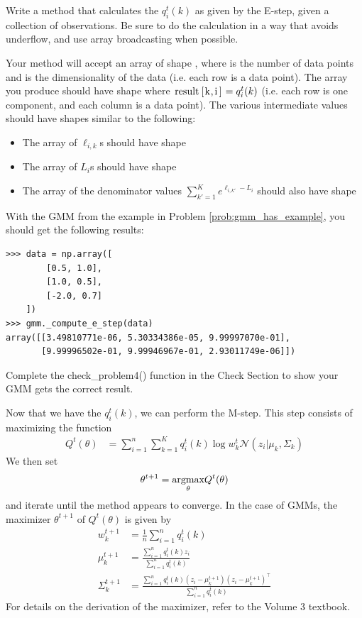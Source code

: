 \begin{problem}
\label{gmm:prob:estep}
Write a method  that calculates the \(q_i^t(k)\) as given by the E-step, given a collection of observations.
Be sure to do the calculation in a way that avoids underflow, and use array broadcasting when possible.

Your method will accept an array of shape , where  is the number of data points and  is the dimensionality of the data (i.e. each row is a data point).
The array you produce should have shape  where \(\text{\li{result[k,i]}} = q_i^t(k)\) (i.e. each row is one component, and each column is a data point).
The various intermediate values should have shapes similar to the following:
\begin{itemize}
\item The array of \(\ell_{i,k}\)s should have shape 
\item The array of \(L_i\)s should have shape 
\item The array of the denominator values \(\sum_{k'=1}^K
e^{\ell_{i,k'}-L_i}\) should also have shape 
\end{itemize}

\noindent
With the GMM from the example in Problem \ref{prob:gmm_has_example}, you should get the following results:
\begin{lstlisting}
>>> data = np.array([
        [0.5, 1.0],
        [1.0, 0.5],
        [-2.0, 0.7]
    ])
>>> gmm._compute_e_step(data)
array([[3.49810771e-06, 5.30334386e-05, 9.99997070e-01],
       [9.99996502e-01, 9.99946967e-01, 2.93011749e-06]])
\end{lstlisting}

Complete the check\_problem4() function in the Check Section to show your GMM gets the correct result.
\end{problem}

Now that we have the \(q_i^t(k)\), we can perform the M-step.
This step consists of maximizing the function
\begin{align*}
Q^t(\theta)
&=\sum_{i=1}^n
\sum_{k=1}^K
q_i^t(k)\log w_k^t\mathcal{N}(z_i| \mu_k,\Sigma_k)
\end{align*}
We then set
\[
\theta^{t+1}=\underset{\theta}{\mbox{argmax}} Q^t(\theta)
\]
and iterate until the method appears to converge.
In the case of GMMs, the maximizer \(\theta^{t+1}\) of \(Q^t(\theta)\) is given by
\begin{align*}
w_k^{t+1}&=\frac{1}{n}\sum_{i=1}^n q_i^t(k) \\
\mu_k^{t+1}
&=
\frac{\sum_{i=1}^n q_i^t(k) z_i}{\sum_{i=1}^n q_i^t(k)}
\\
\Sigma_k^{t+1}
&=
\frac{\sum_{i=1}^n q_i^t(k) (z_i-\mu_k^{t+1})(z_i-\mu_k^{t+1})^\top}{\sum_{i=1}^n q_i^t(k)}
\end{align*}
For details on the derivation of the maximizer, refer to the Volume 3 textbook.

